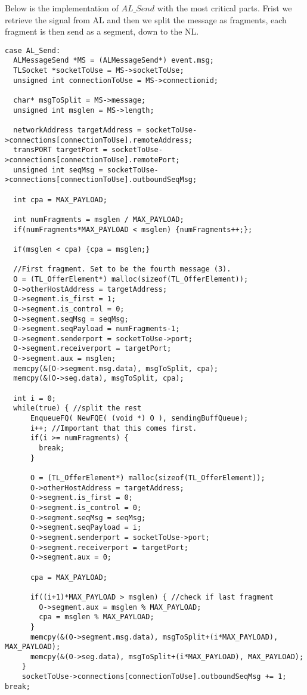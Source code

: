 Below is the implementation of $AL\_Send$ with the most critical parts.
Frist we retrieve the signal from AL and then we split the message as fragments,
each fragment is then send as a segment, down to the NL.
\begin{lstlisting}
case AL_Send:
  ALMessageSend *MS = (ALMessageSend*) event.msg;
  TLSocket *socketToUse = MS->socketToUse;
  unsigned int connectionToUse = MS->connectionid;

  char* msgToSplit = MS->message;
  unsigned int msglen = MS->length;

  networkAddress targetAddress = socketToUse->connections[connectionToUse].remoteAddress;
  transPORT targetPort = socketToUse->connections[connectionToUse].remotePort;
  unsigned int seqMsg = socketToUse->connections[connectionToUse].outboundSeqMsg;

  int cpa = MAX_PAYLOAD;

  int numFragments = msglen / MAX_PAYLOAD;
  if(numFragments*MAX_PAYLOAD < msglen) {numFragments++;};

  if(msglen < cpa) {cpa = msglen;}

  //First fragment. Set to be the fourth message (3).
  O = (TL_OfferElement*) malloc(sizeof(TL_OfferElement));
  O->otherHostAddress = targetAddress;
  O->segment.is_first = 1;
  O->segment.is_control = 0;
  O->segment.seqMsg = seqMsg;
  O->segment.seqPayload = numFragments-1;
  O->segment.senderport = socketToUse->port;
  O->segment.receiverport = targetPort;
  O->segment.aux = msglen;
  memcpy(&(O->segment.msg.data), msgToSplit, cpa);
  memcpy(&(O->seg.data), msgToSplit, cpa);

  int i = 0;
  while(true) { //split the rest
      EnqueueFQ( NewFQE( (void *) O ), sendingBuffQueue);
      i++; //Important that this comes first.
      if(i >= numFragments) {
        break;
      }

      O = (TL_OfferElement*) malloc(sizeof(TL_OfferElement));
      O->otherHostAddress = targetAddress;
      O->segment.is_first = 0;
      O->segment.is_control = 0;
      O->segment.seqMsg = seqMsg;
      O->segment.seqPayload = i;
      O->segment.senderport = socketToUse->port;
      O->segment.receiverport = targetPort;
      O->segment.aux = 0;

      cpa = MAX_PAYLOAD;

      if((i+1)*MAX_PAYLOAD > msglen) { //check if last fragment
        O->segment.aux = msglen % MAX_PAYLOAD;
        cpa = msglen % MAX_PAYLOAD;
      }
      memcpy(&(O->segment.msg.data), msgToSplit+(i*MAX_PAYLOAD), MAX_PAYLOAD);
      memcpy(&(O->seg.data), msgToSplit+(i*MAX_PAYLOAD), MAX_PAYLOAD);
    }
    socketToUse->connections[connectionToUse].outboundSeqMsg += 1;
break;
\end{lstlisting}


